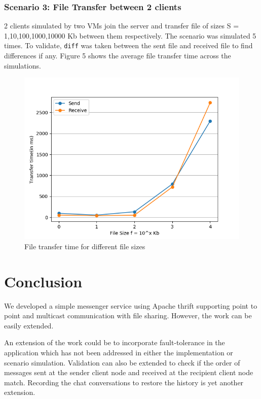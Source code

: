 \documentclass[a4paper,10pt]{article}
\begin{document}
\subsubsection{Scenario 3: File Transfer between 2 clients}
2 clients simulated by two VMs join the server and transfer file of sizes S = 1,10,100,1000,10000 Kb between them respectively. The scenario was simulated 5 times. To validate, \texttt{diff} was taken between the sent file and received file to find differences if any. Figure 5 shows the average file transfer time across the simulations.
\begin{figure}[h]   
    \hspace{2cm}
    \includegraphics[scale=0.5]{fileTransfer_5Readings}
    \caption{File transfer time for different file sizes}
    \label{fig:diagram2}
\end{figure}

\section{Conclusion}
We developed a simple messenger service using Apache thrift supporting point to point and multicast communication with file sharing. However, the work can be easily extended. \par An extension of the work could be to incorporate fault-tolerance in the application which has not been addressed in either the implementation or scenario simulation. Validation can also be extended to check if the order of messages sent at the sender client node and received at the recipient client node match. Recording the chat conversations to restore the history is yet another extension.
\end{document}
